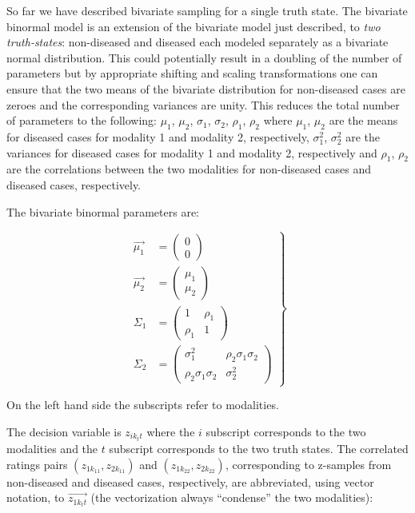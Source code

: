 \documentclass[
]{book}
\begin{document}
So far we have described bivariate sampling for a single truth state. The bivariate binormal model is an extension of the bivariate model just described, to \emph{two truth-states}: non-diseased and diseased each modeled separately as a bivariate normal distribution. This could potentially result in a doubling of the number of parameters but by appropriate shifting and scaling transformations one can ensure that the two means of the bivariate distribution for non-diseased cases are zeroes and the corresponding variances are unity. This reduces the total number of parameters to the following: \(\mu_1\), \(\mu_2\), \(\sigma_1\), \(\sigma_2\), \(\rho_1\), \(\rho_2\) where \(\mu_1\), \(\mu_2\) are the means for diseased cases for modality 1 and modality 2, respectively, \(\sigma_1^2\), \(\sigma_2^2\) are the variances for diseased cases for modality 1 and modality 2, respectively and \(\rho_1\), \(\rho_2\) are the correlations between the two modalities for non-diseased cases and diseased cases, respectively.

The bivariate binormal parameters are:

\begin{equation} 
\left.\begin{aligned}
\overrightarrow{
\mu_1}&=
\left( \begin{matrix}
0 \\
0
\end{matrix}
\right)\\
\overrightarrow{
\mu_2}&=
\left( \begin{matrix}
\mu_1 \\
\mu_2
\end{matrix}
\right)\\
\Sigma_1&=
\left( 
\begin{matrix}
1 & \rho_1 \\
\rho_1  & 1
\end{matrix}
\right) \\
\Sigma_2 &= \left( 
\begin{matrix}
\sigma_1^2 & \rho_2 \sigma_1 \sigma_2 \\
\rho_2 \sigma_1 \sigma_2  & \sigma_2^2
\end{matrix}
\right)
\end{aligned}\right\}
\label{eq:bivariate-binormal-model-all-parameters}
\end{equation}

On the left hand side the subscripts refer to modalities.

The decision variable is \(z_{ik_tt}\) where the \(i\) subscript corresponds to the two modalities and the \(t\) subscript corresponds to the two truth states. The correlated ratings pairs \(\left( z_{1k_11},z_{2k_11} \right)\) and \(\left( z_{1k_22},z_{2k_22} \right)\), corresponding to z-samples from non-diseased and diseased cases, respectively, are abbreviated, using vector notation, to \(\overrightarrow{z_{1k_tt}}\) (the vectorization always ``condense'' the two modalities):
\end{document}
